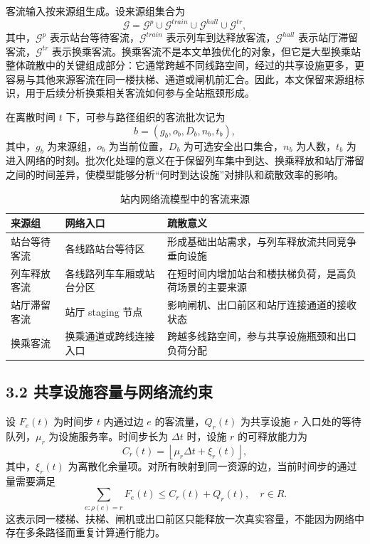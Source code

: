 \documentclass[UTF8,a4paper,12pt]{ctexart}
\begin{document}
客流输入按来源组生成。设来源组集合为
\[
\mathcal G=\mathcal G^{p}\cup \mathcal G^{train}\cup \mathcal G^{hall}\cup \mathcal G^{tr},
\]
其中，\(\mathcal G^{p}\) 表示站台等待客流，\(\mathcal G^{train}\) 表示列车到达释放客流，\(\mathcal G^{hall}\) 表示站厅滞留客流，\(\mathcal G^{tr}\) 表示换乘客流。换乘客流不是本文单独优化的对象，但它是大型换乘站整体疏散中的关键组成部分：它通常跨越不同线路空间，经过的共享设施更多，更容易与其他来源客流在同一楼扶梯、通道或闸机前汇合。因此，本文保留来源组标识，用于后续分析换乘相关客流如何参与全站瓶颈形成。

在离散时间 \(t\) 下，可参与路径组织的客流批次记为
\[
b=(g_b,o_b,D_b,n_b,t_b),
\]
其中，\(g_b\) 为来源组，\(o_b\) 为当前位置，\(D_b\) 为可选安全出口集合，\(n_b\) 为人数，\(t_b\) 为进入网络的时刻。批次化处理的意义在于保留列车集中到达、换乘释放和站厅滞留之间的时间差异，使模型能够分析“何时到达设施”对排队和疏散效率的影响。

\begin{table}[htbp]
\centering
\caption{站内网络流模型中的客流来源}
\small
\begin{tabular}{p{}p{}p{}}
\toprule
来源组 & 网络入口 & 疏散意义 \\
\midrule
站台等待客流 & 各线路站台等待区 & 形成基础出站需求，与列车释放流共同竞争垂向设施 \\
列车释放客流 & 各线路列车车厢或站台分区 & 在短时间内增加站台和楼扶梯负荷，是高负荷场景的主要来源 \\
站厅滞留客流 & 站厅 staging 节点 & 影响闸机、出口前区和站厅连接通道的接收状态 \\
换乘客流 & 换乘通道或跨线连接入口 & 跨越多线路空间，参与共享设施瓶颈和出口负荷分配 \\
\bottomrule
\end{tabular}
\end{table}

\subsection{3.2 共享设施容量与网络流约束}

设 \(F_e(t)\) 为时间步 \(t\) 内通过边 \(e\) 的客流量，\(Q_r(t)\) 为共享设施 \(r\) 入口处的等待队列，\(\mu_r\) 为设施服务率。时间步长为 \(\Delta t\) 时，设施 \(r\) 的可释放能力为
\[
C_r(t)=\left\lfloor \mu_r\Delta t+\xi_r(t)\right\rfloor,
\]
其中，\(\xi_r(t)\) 为离散化余量项。对所有映射到同一资源的边，当前时间步的通过量需要满足
\[
\sum_{e:\rho(e)=r}F_e(t)\leq C_r(t)+Q_r(t),\quad r\in R.
\]
这表示同一楼梯、扶梯、闸机或出口前区只能释放一次真实容量，不能因为网络中存在多条路径而重复计算通行能力。
\end{document}
